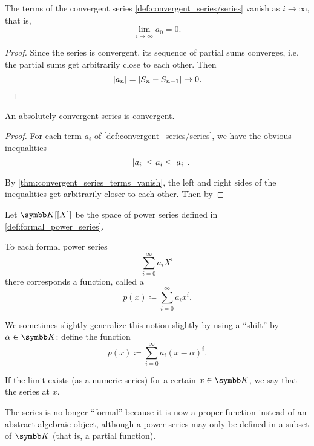 \begin{proposition}\label{thm:convergent_series_terms_vanish}
  The terms of the convergent series \cref{def:convergent_series/series} vanish as \( i \to \infty \), that is,
  \begin{equation*}
    \lim_{i \to \infty} a_0 = 0.
  \end{equation*}
\end{proposition}
\begin{proof}
  Since the series is convergent, its sequence of partial sums converges, i.e. the partial sums get arbitrarily close to each other. Then
  \begin{equation*}
    \left\vert a_n \right\vert = \left\vert S_n - S_{n-1} \right\vert \to 0.
  \end{equation*}
\end{proof}

\begin{proposition}\label{thm:absolutely_convergent_series_is_convergent}
  An absolutely convergent series is convergent.
\end{proposition}
\begin{proof}
  For each term \( a_i \) of \cref{def:convergent_series/series}, we have the obvious inequalities
  \begin{equation*}
    -\left\vert a_i \right\vert \leq a_i \leq \left\vert a_i \right\vert.
  \end{equation*}

  By \cref{thm:convergent_series_terms_vanish}, the left and right sides of the inequalities get arbitrarily closer to each other. Then by
\end{proof}

\begin{definition}\label{def:convergent_power_series}
  Let \( \K[[X]] \) be the space of power series defined in \cref{def:formal_power_series}.

  To each formal power series
  \begin{equation*}
    \sum_{i=0}^\infty a_i X^i
  \end{equation*}
  there corresponds a function, called a 
  \begin{equation}\label{def:convergent_power_series/series}
    p(x) \coloneqq \sum_{i=0}^\infty a_i x^i.
  \end{equation}

  We sometimes slightly generalize this notion slightly by using a \enquote{shift} by \( \alpha \in \K \): define the function
  \begin{equation}\label{def:convergent_power_series/shifted_series}
    p(x) \coloneqq \sum_{i=0}^\infty a_i (x - \alpha)^i.
  \end{equation}

  If the limit exists (as a numeric series) for a certain \( x \in \K \), we say that the series  at \( x \).

  The series is no longer \enquote{formal} because it is now a proper function instead of an abstract algebraic object, although a power series may only be defined in a subset of \( \K \) (that is, a partial function).
\end{definition}

